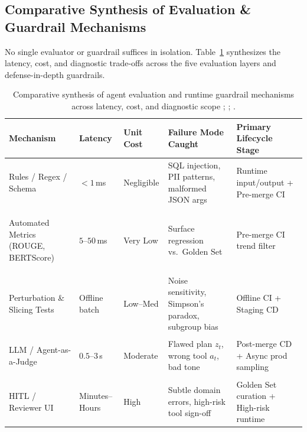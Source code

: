 \documentclass[../../../../master.tex]{subfiles}
\begin{document}
\subsection{Comparative Synthesis of Evaluation \& Guardrail Mechanisms}
\label{sec:ops:comparison}

No single evaluator or guardrail suffices in isolation. Table~\ref{tab:ops:evaluators} synthesizes the latency, cost, and diagnostic trade-offs across the five evaluation layers and defense-in-depth guardrails.

\begin{table}[htbp]
\centering
\caption{Comparative synthesis of agent evaluation and runtime guardrail mechanisms across latency, cost, and diagnostic scope ; ; .}
\label{tab:ops:evaluators}
\renewcommand{\arraystretch}{1.22}
\begin{tabularx}{\textwidth}{@{}>{\bfseries\raggedright\arraybackslash}p{}>{\raggedright\arraybackslash}p{}>{\raggedright\arraybackslash}p{}>{\raggedright\arraybackslash}p{}>{\raggedright\arraybackslash}X@{}}
\toprule
\textbf{Mechanism} & \textbf{Latency} & \textbf{Unit Cost} & \textbf{Failure Mode Caught} & \textbf{Primary Lifecycle Stage} \\
\midrule
Rules / Regex / Schema & $<1$\,ms & Negligible & SQL injection, PII patterns, malformed JSON args & Runtime input/output + Pre-merge CI \\
Automated Metrics (ROUGE, BERTScore) & $5$--$50$\,ms & Very Low & Surface regression vs.\ Golden Set & Pre-merge CI trend filter \\
Perturbation \& Slicing Tests & Offline batch & Low--Med & Noise sensitivity, Simpson's paradox, subgroup bias & Offline CI + Staging CD \\
LLM / Agent-as-a-Judge & $0.5$--$3$\,s & Moderate & Flawed plan $z_t$, wrong tool $a_t$, bad tone & Post-merge CD + Async prod sampling \\
HITL / Reviewer UI & Minutes--Hours & High & Subtle domain errors, high-risk tool sign-off & Golden Set curation + High-risk runtime \\
\bottomrule
\end{tabularx}
\end{table}
\end{document}
